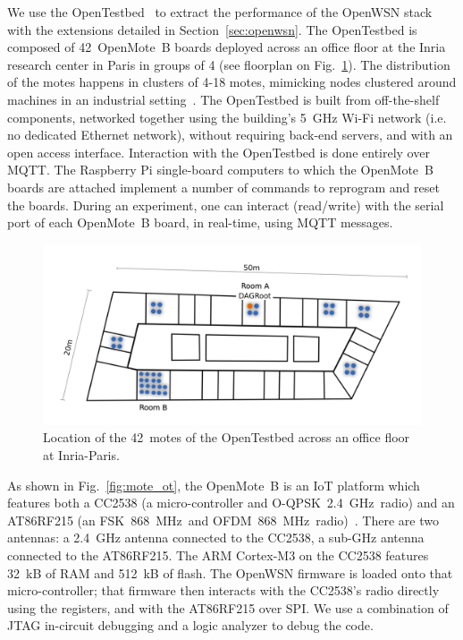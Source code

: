 \documentclass[sensors,article,submit,moreauthors,pdftex]{Definitions/mdpi}
\newcommand{\fsk}           {FSK~868~MHz}
\newcommand{\oqpsk}         {O-QPSK~2.4~GHz}
\newcommand{\ofdm}          {OFDM~868~MHz}
\newcommand{\figwidth}      {0.78}
\begin{document}
We use the OpenTestbed~\cite{munoz19opentestbed} to extract the performance of the OpenWSN stack with the extensions detailed in Section~\ref{sec:openwsn}.
The OpenTestbed is composed of 42~OpenMote~B boards deployed across an office floor at the Inria research center in Paris in groups of 4 (see floorplan on Fig.~\ref{fig:building_motes}).
The distribution of the motes happens in clusters of 4-18 motes, mimicking nodes clustered around machines in an industrial setting~\cite{civerchia17industrial}.
The OpenTestbed is built from off-the-shelf components,
    networked together using the building's 5~GHz Wi-Fi network (i.e. no dedicated Ethernet network),
    without requiring back-end servers, and
    with an open access interface.
Interaction with the OpenTestbed is done entirely over MQTT.
The Raspberry Pi single-board computers to which the OpenMote~B boards are attached implement a number of commands to reprogram and reset the boards.
During an experiment, one can interact (read/write) with the serial port of each OpenMote~B board, in real-time, using MQTT messages.

\begin{figure}
	\centering
	\includegraphics[width=\figwidth\columnwidth]{building_motes}
	\caption{Location of the 42~motes of the OpenTestbed across an office floor at Inria-Paris.}
    \label{fig:building_motes}
\end{figure}


As shown in Fig.~\ref{fig:mote_ot}, the OpenMote~B is an IoT platform which features both
    a CC2538 (a micro-controller and \oqpsk\ radio) and
    an AT86RF215 (an \fsk\ and \ofdm\  radio)~\cite{tuset16openmote}.
There are two antennas:
    a 2.4~GHz antenna connected to the CC2538,
    a sub-GHz antenna connected to the AT86RF215.
The ARM Cortex-M3 on the CC2538 features 32~kB of RAM and 512~kB of flash.
The OpenWSN firmware is loaded onto that micro-controller;
    that firmware then interacts with the CC2538's radio directly using the registers,
    and with the AT86RF215 over SPI.
We use a combination of JTAG in-circuit debugging and a logic analyzer to debug the code.
\end{document}
